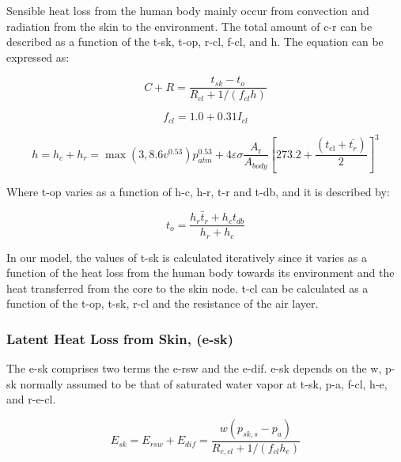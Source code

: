 Sensible heat loss from the human body mainly occur from convection and radiation from the skin to the environment.
The total amount of \ac{c-r} can be described as a function of the \ac{t-sk}, \ac{t-op}, \ac{r-cl}, \ac{f-cl}, and \ac{h}.
The equation can be expressed as:

\begin{equation}
    C+R=\frac{t_{s k}-t_{o}}{R_{c l}+1 /\left(f_{c l} h\right)}\label{eq:c-r}
\end{equation}

\begin{equation}
    f_{cl}=1.0 + 0.31 I_{cl} \label{eq:f-cl}
\end{equation}

\begin{equation}
    h=h_{c} + h_{r} = \max(3, 8.6 v^{0.53}) p_{atm}^{0.53} + 4 \varepsilon \sigma \frac{A_{\mathrm{r}}}{A_{body}}\left[273.2+\frac{\left(t_{\mathrm{cl}}+\overline{t_{r}}\right)}{2}\right]^{3}\label{eq:h}
\end{equation}


Where \ac{t-op} varies as a function of \ac{h-c}, \ac{h-r}, \ac{t-r} and \ac{t-db}, and it is described by:

\begin{equation}
    t_{o}=\frac{h_{r} \bar{t}_{r}+h_{c} t_{db}}{h_{r}+h_{c}}\label{eq:t-op}
\end{equation}

In our model, the values of \ac{t-sk} is calculated iteratively since it varies as a function of the heat loss from the human body towards its environment and the heat transferred from the core to the skin node.
\Ac{t-cl} can be calculated as a function of the \ac{t-op}, \ac{t-sk}, \ac{r-cl} and the resistance of the air layer.

\subsubsection{Latent Heat Loss from Skin, (\acs{e-sk})}

The \acf{e-sk} comprises two terms the \ac{e-rsw} and the \ac{e-dif}.
\ac{e-sk} depends on the \ac{w}, \ac{p-sk} normally assumed to be that of saturated water vapor at \ac{t-sk}, \ac{p-a}, \ac{f-cl}, \ac{h-e}, and \ac{r-e-cl}.

\begin{equation}
    E_{s k}=E_{rsw}+E_{dif}=\frac{w\left(p_{s k, s}-p_{a}\right)}{R_{e, c l}+1 /\left(f_{c l} h_{e}\right)}\label{eq:latent-skin}
\end{equation}

